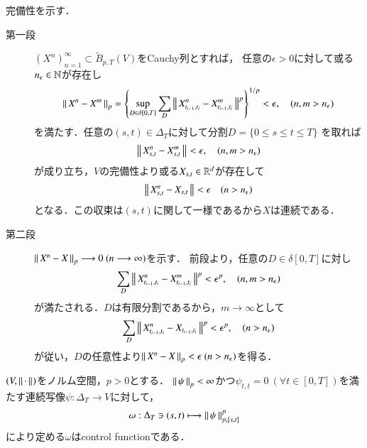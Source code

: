 \begin{prf}完備性を示す．
	\begin{description}
		\item[第一段] $(X^n)_{n=1}^{\infty} \subset \tilde{B}_{p,T}(V)$をCauchy列とすれば，
			任意の$\epsilon > 0$に対して或る$n_\epsilon \in \mathbb{N}$が存在し
			\begin{align}
				\left\|\, X^n - X^m\, \right\|_{p}
				= \left\{ \operatorname*{sup}_{D \in \delta[0,T]} \sum_{D} 
				\left\|\, X^n_{t_{i-1},t_i} - X^m_{t_{i-1},t_i}\, \right\|_{}^p \right\}^{1/p} < \epsilon,
				\quad (n,m > n_\epsilon)
			\end{align}
			を満たす．任意の$(s,t) \in \Delta_T$に対して分割$D = \{0 \leq s \leq t \leq T\}$
			を取れば
			\begin{align}
				\left\|\, X^n_{s,t} - X^m_{s,t}\, \right\|_{} < \epsilon,
				\quad (n,m > n_\epsilon)
			\end{align}
			が成り立ち，$V$の完備性より或る$X_{s,t} \in \mathbb{R}^d$が存在して
			\begin{align}
				\left\|\, X^n_{s,t} - X_{s,t}\, \right\|_{} < \epsilon
				\quad (n > n_\epsilon)
			\end{align}
			となる．この収束は$(s,t)$に関して一様であるから$X$は連続である．
			
		\item[第二段] $\left\|\, X^n - X\, \right\|_{p} \longrightarrow 0\ (n \longrightarrow \infty)$を示す．
			前段より，任意の$D \in \delta[0,T]$に対し
			\begin{align}
				\sum_D \left\|\, X^n_{t_{i-1},t_i} - X^m_{t_{i-1},t_i}\, \right\|_{}^p
				< \epsilon^p,
				\quad (n,m > n_\epsilon)
			\end{align}
			が満たされる．$D$は有限分割であるから，$m \longrightarrow \infty$として
			\begin{align}
				\sum_D \left\|\, X^n_{t_{i-1},t_i} - X_{t_{i-1},t_i}\, \right\|_{}^p
				< \epsilon^p,
				\quad (n > n_\epsilon)
			\end{align}
			が従い，$D$の任意性より$\left\|\, X^n - X\, \right\|_{p} < \epsilon\ (n > n_\epsilon)$を得る．
			\QED
	\end{description}
\end{prf}

	\begin{screen}
		\begin{thm}
		\label{thm:control_function_defined_by_p_variation}
			$(V,\left\|\, \cdot\, \right\|_{})$をノルム空間，$p > 0$とする．
			$\left\|\, \psi\, \right\|_{p} < \infty$かつ$\psi_{t,t} = 0\ (\forall t \in [0,T])$を満たす連続写像$\psi:\Delta_T \longrightarrow V$に対して，
			\begin{align}
				\omega:\Delta_T \ni (s,t) \longmapsto \left\|\, \psi\, \right\|_{p,[s,t]}^p
			\end{align}
			により定める$\omega$はcontrol functionである．
		\end{thm}
	\end{screen}
	

